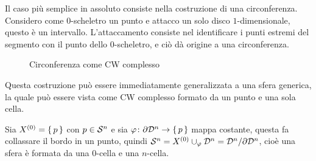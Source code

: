\begin{example}[Circonferenza]
  Il caso più semplice in assoluto consiste nella costruzione di una circonferenza.
  Considero come $ 0 $-scheletro un punto e attacco un solo disco $ 1 $-dimensionale,
  questo è un intervallo. L'attaccamento consiste nel identificare i punti estremi del
  segmento con il punto dello $ 0 $-scheletro, e ciò dà origine a una circonferenza.
  \begin{figure}[htbp]
    \centering
    \caption{Circonferenza come CW complesso}
  \end{figure}
\end{example}
Questa costruzione può essere immediatamente generalizzata a una sfera generica, la quale
può essere vista come CW complesso formato da un punto e una sola cella.
\begin{example}[Sfere]
  Sia $ X^{(0)} = \set{p} $ con $ p \in \mathcal{S}^{n} $ e sia
  $ \varphi \colon \partial \mathcal{D}^{n} \to \set{p} $ mappa costante, questa fa collassare il bordo in
  un punto, quindi
  $ \mathcal{S}^{n} = X^{(0)} \cup_\varphi \mathcal{D}^{n} = {\mathcal{D}^{n}} \slash {\partial \mathcal{D}^{n}} $, cioè una sfera
  è formata da una $ 0 $-cella e una $ n $-cella.
\end{example}
